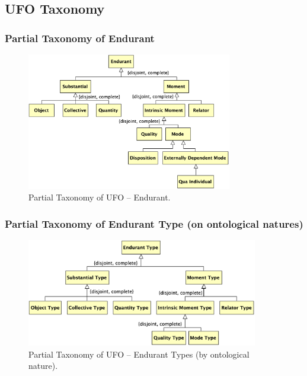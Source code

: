 \documentclass{article}
\newcommand{\BeginEndurantTaxonomy}{88}
\newcommand{\EndEndurantTaxonomy}{145}
\begin{document}


\subsection{UFO Taxonomy}

\subsubsection{Partial Taxonomy of Endurant}

\begin{figure}[ht]
    \centering
    \includegraphics[width=0.8\textwidth]{diagrams/Endurant_Diagram.png}
    \caption{Partial Taxonomy of UFO -- Endurant.}
    \label{fig:ufo_taxonomy_endurant}
\end{figure}



\subsubsection{Partial Taxonomy of Endurant Type (on ontological natures)}

\begin{figure}[ht]
    \centering
    \includegraphics[width=0.9\textwidth]{diagrams/Endurant_Type_Natures_Diagram.png}
    \caption{Partial Taxonomy of UFO -- Endurant Types (by ontological nature).}
    \label{fig:ufo_taxonomy_endurant_types_natures}
\end{figure}
\end{document}
